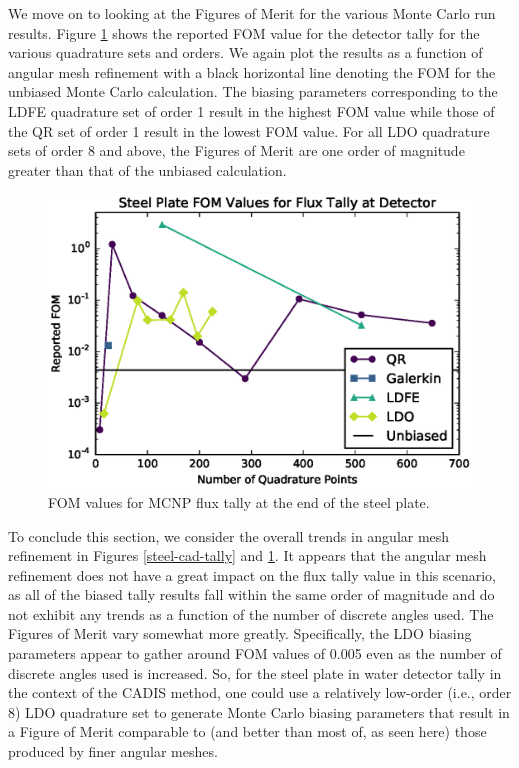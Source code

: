 \documentclass{article} %
\begin{document}
We move on to looking at the Figures of Merit for the various Monte Carlo run
results. Figure \ref{steel-cad-fom} shows the reported FOM value for the
detector tally for the various quadrature sets and orders. We again plot the
results as a function of angular mesh refinement with a black horizontal line
denoting the FOM for the unbiased Monte Carlo calculation. The biasing
parameters corresponding to the LDFE quadrature set of order 1 result in the
highest FOM value while those of the QR set of order 1 result in the lowest
FOM value. For all LDO quadrature sets of order 8 and above, the Figures of
Merit are one order of magnitude greater than that of the unbiased
calculation.

\begin{figure}[!htb]
\centering
\includegraphics[max height=0.445\textheight]{img/steel-cadis-fom.eps}
\caption{FOM values for MCNP flux tally at the end of the steel plate.}
\label{steel-cad-fom}
\end{figure}

To conclude this section, we consider the overall trends in angular mesh
refinement in Figures \ref{steel-cad-tally} and \ref{steel-cad-fom}. It
appears that the angular mesh refinement does not have a great impact on the
flux tally value in this scenario, as all of the biased tally results fall
within the same order of magnitude and do not exhibit any trends as a function
of the number of discrete angles used. The Figures of Merit vary somewhat
more greatly. Specifically, the LDO biasing parameters appear to gather around
FOM values of 0.005 even as the number of discrete angles used is increased.
So, for the steel plate in water detector tally in the context of the CADIS
method, one could use a relatively low-order (i.e., order 8) LDO quadrature
set to generate Monte Carlo biasing parameters that result in a Figure of
Merit comparable to (and better than most of, as seen here) those produced by
finer angular meshes.
\end{document}
